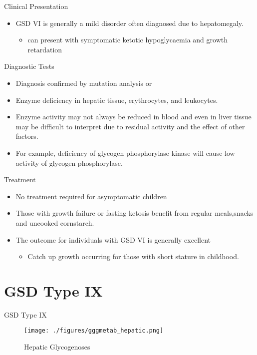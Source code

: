 \documentclass[presentation, smaller]{beamer}
\begin{document}
\begin{frame}[label={sec:org36db393}]{Clinical Presentation}
\begin{itemize}
\item GSD VI is generally a mild disorder often diagnosed due to hepatomegaly.
\begin{itemize}
\item can present with symptomatic ketotic hypoglycaemia and growth retardation
\end{itemize}
\end{itemize}
\end{frame}
\begin{frame}[label={sec:org40ae42a}]{Diagnostic Tests}
\begin{itemize}
\item Diagnosis confirmed by mutation analysis or
\item Enzyme deficiency in hepatic tissue, erythrocytes, and leukocytes.
\item Enzyme activity may not always be reduced in blood and even in liver
tissue may be difficult to interpret due to residual activity and
the effect of other factors.
\item For example, deficiency of glycogen phosphorylase kinase will cause
low activity of glycogen phosphorylase.
\end{itemize}
\end{frame}
\begin{frame}[label={sec:org54f64de}]{Treatment}
\begin{itemize}
\item No treatment required for asymptomatic children
\item Those with growth failure or fasting ketosis benefit from regular
meals,snacks and uncooked cornstarch.
\item The outcome for individuals with GSD VI is generally excellent
\begin{itemize}
\item Catch up growth occurring for those with short stature in childhood.
\end{itemize}
\end{itemize}
\end{frame}
\section{GSD Type IX}
\label{sec:org82202d9}
\begin{frame}[label={sec:org3782a4f}]{GSD Type IX}
\begin{figure}[htbp]
\centering
\texttt{[image: ./figures/gggmetab\_hepatic.png]}
\caption[Hepatic Glycogenoses]{\label{fig:org64c4ce9}
Hepatic Glycogenoses}
\end{figure}
\end{frame}
\end{document}
